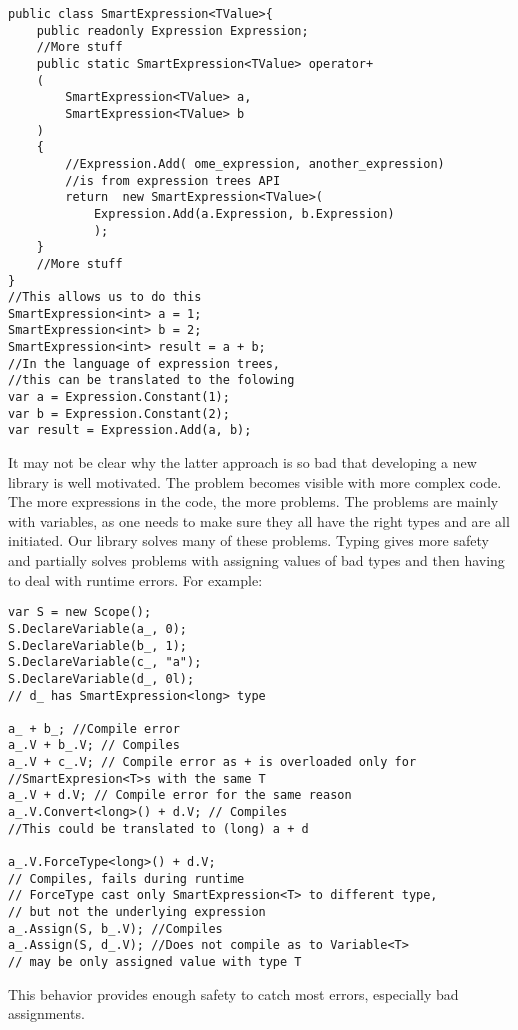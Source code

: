 \begin{lstlisting}
public class SmartExpression<TValue>{
    public readonly Expression Expression;
    //More stuff
    public static SmartExpression<TValue> operator+
    (
        SmartExpression<TValue> a, 
        SmartExpression<TValue> b
    )
    {
        //Expression.Add( ome_expression, another_expression) 
        //is from expression trees API
        return  new SmartExpression<TValue>(
            Expression.Add(a.Expression, b.Expression)
            );
    }
    //More stuff
}
//This allows us to do this
SmartExpression<int> a = 1;
SmartExpression<int> b = 2;
SmartExpression<int> result = a + b;
//In the language of expression trees,
//this can be translated to the folowing
var a = Expression.Constant(1);
var b = Expression.Constant(2);
var result = Expression.Add(a, b);
\end{lstlisting}
It may not be clear why the latter approach is so bad that developing a new library is well motivated. The problem becomes visible with more complex code. The more expressions in the code, the more problems. The problems are mainly with variables, as one needs to make sure they all have the right types and are all initiated. Our library solves many of these problems. Typing gives more safety and partially solves problems with assigning values of bad types and then having to deal with runtime errors. For example:
\begin{lstlisting}
var S = new Scope();
S.DeclareVariable(a_, 0);
S.DeclareVariable(b_, 1);
S.DeclareVariable(c_, "a");
S.DeclareVariable(d_, 0l); 
// d_ has SmartExpression<long> type

a_ + b_; //Compile error
a_.V + b_.V; // Compiles
a_.V + c_.V; // Compile error as + is overloaded only for 
//SmartExpresion<T>s with the same T
a_.V + d.V; // Compile error for the same reason
a_.V.Convert<long>() + d.V; // Compiles
//This could be translated to (long) a + d 

a_.V.ForceType<long>() + d.V;
// Compiles, fails during runtime
// ForceType cast only SmartExpression<T> to different type,
// but not the underlying expression
a_.Assign(S, b_.V); //Compiles
a_.Assign(S, d_.V); //Does not compile as to Variable<T> 
// may be only assigned value with type T
\end{lstlisting}
This behavior provides enough safety to catch most errors, especially bad assignments.

